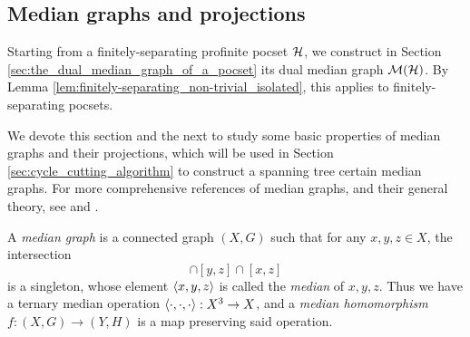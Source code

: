 \documentclass[reqno]{amsart}
\begin{document}
    \subsection{Median graphs and projections}

    Starting from a finitely-separating profinite pocset $\mathcal{H}$, we construct in Section \ref{sec:the_dual_median_graph_of_a_pocset} its dual median graph $\mathcal{M}(\mathcal{H})$. By Lemma \ref{lem:finitely-separating_non-trivial_isolated}, this applies to finitely-separating pocsets.

    We devote this section and the next to study some basic properties of median graphs and their projections, which will be used in Section \ref{sec:cycle_cutting_algorithm} to construct a spanning tree certain median graphs. For more comprehensive references of median graphs, and their general theory, see \cite{Rol98} and \cite{Bow22}.

    \begin{definition}
        A \textit{median graph} is a connected graph $(X,G)$ such that for any $x,y,z\in X$, the intersection
        \begin{equation*}
            [x,y]\cap[y,z]\cap[x,z]
        \end{equation*}
        is a singleton, whose element $\left\langle x,y,z\right\rangle$ is called the \textit{median} of $x,y,z$. Thus we have a ternary median operation $\left\langle\cdot,\cdot,\cdot\right\rangle:X^3\to X$, and a \textit{median homomorphism} $f:(X,G)\to(Y,H)$ is a map preserving said operation.
    \end{definition}
\end{document}
